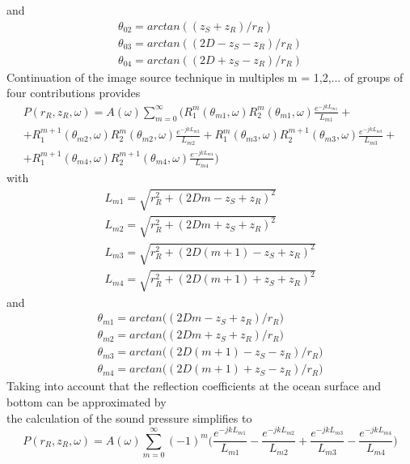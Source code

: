 \noindent and
\begin{equation}
\begin{gathered} 
\theta_{02}  = arctan((z_{S} + z_{R}) / r_{R}) \\
\theta_{03}  = arctan((2D - z_{S} - z_{R}) / r_{R}) \\
\theta_{04}  = arctan((2D + z_{S} - z_{R}) / r_{R})
\end{gathered} 
\end{equation}
\noindent Continuation of the image source technique in multiples m = 1,2,... of groups of four contributions provides
\begin{equation}
\begin{gathered} 
\textit{$P(r_R, z_R,\omega)$} = A(\omega)\sum_{m=0}^{\infty} \Bigg( R_{1}^{m}(\theta_{m1},\omega)  R_{2}^{m}(\theta_{m1},\omega)  \frac{e^{-jkL_{m1}}}{L_{m1}} + \\
 + R_{1}^{m+1}(\theta_{m2},\omega)  R_{2}^{m}(\theta_{m2},\omega)  \frac{e^{-jkL_{m2}}}{L_{m2}} +  R_{1}^{m}(\theta_{m3},\omega)  R_{2}^{m+1}(\theta_{m3},\omega)  \frac{e^{-jkL_{m3}}}{L_{m3}} + \\
 +  R_{1}^{m+1}(\theta_{m4},\omega)  R_{2}^{m+1}(\theta_{m4},\omega)  \frac{e^{-jkL_{m4}}}{L_{m4}} \Bigg)
\end{gathered}
\end{equation}
\noindent with
\begin{equation}
\begin{gathered} 
L_{m1}  = \sqrt{r_{R}^{2} + (2Dm - z_{S} + z_{R})^{2}} \\
L_{m2}  = \sqrt{r_{R}^{2} + (2Dm + z_{S} + z_{R})^{2}} \\
L_{m3}  = \sqrt{r_{R}^{2} + (2D(m+1) - z_{S} + z_{R})^{2}} \\
L_{m4}  = \sqrt{r_{R}^{2} + (2D(m+1) + z_{S} + z_{R})^{2}}
\end{gathered} 
\end{equation}
\noindent and
\begin{equation}
\begin{gathered} 
\theta_{m1}  = arctan \Big((2Dm - z_{S} + z_{R}) / r_{R} \Big) \\
\theta_{m2}  = arctan \Big((2Dm + z_{S} + z_{R}) / r_{R} \Big) \\
\theta_{m3}  = arctan \Big((2D(m+1 ) - z_{S} - z_{R}) / r_{R} \Big) \\
\theta_{m4}  = arctan \Big((2D(m+1 ) +  z_{S} - z_{R}) / r_{R} \Big)
\end{gathered} 
\end{equation}
\noindent Taking into account that the reflection coefficients at the ocean surface and bottom can be approximated by \\
\noindent the calculation of the sound pressure simplifies to
\begin{equation}
\textit{$P(r_R, z_R,\omega)$} = A(\omega)\sum_{m=0}^{\infty} (-1)^{m} \Bigg(  \frac{e^{-jkL_{m1}}}{L_{m1}} -
\frac{e^{-jkL_{m2}}}{L_{m2}} +  \frac{e^{-jkL_{m3}}}{L_{m3}} - \frac{e^{-jkL_{m4}}}{L_{m4}} \Bigg)
\end{equation}
